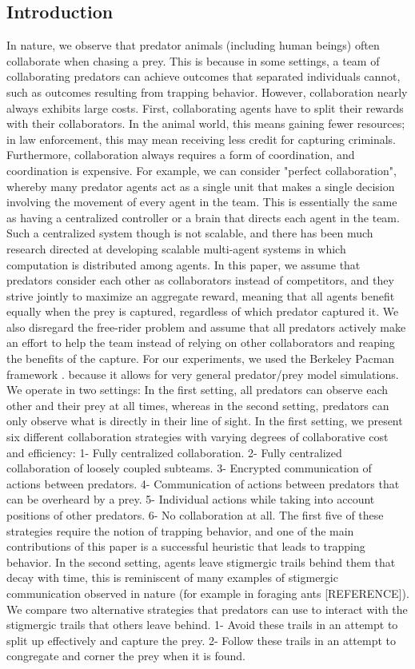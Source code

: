 \documentclass[11pt]{article}
\begin{document}
\begin{multicols}{2}
\section{Introduction}
In nature, we observe that predator animals (including human beings) often collaborate when chasing a prey. This is because in some settings, a team of collaborating predators can achieve outcomes that separated individuals cannot, such as outcomes resulting from trapping behavior. However, collaboration nearly always exhibits large costs. First, collaborating agents have to split their rewards with their collaborators. In the animal world, this means gaining fewer resources; in law enforcement, this may mean receiving less credit for capturing criminals. Furthermore, collaboration always requires a form of coordination, and coordination is expensive. For example, we can consider "perfect collaboration", whereby many predator agents act as a single unit that makes a single decision involving the movement of every agent in the team. This is essentially the same as having a centralized controller or a brain that directs each agent in the team. Such a centralized system though is not scalable, and there has been much research directed at developing scalable multi-agent systems in which computation is distributed among agents. In this paper, we assume that predators consider each other as collaborators instead of competitors, and they strive jointly to maximize an aggregate reward, meaning that all agents benefit equally when the prey is captured, regardless of which predator captured it. We also disregard the free-rider problem and assume that all predators actively make an effort to help the team instead of relying on other collaborators and reaping the benefits of the capture. For our experiments, we used the Berkeley Pacman framework \cite{Pacman}. because it allows for very general predator/prey model simulations. We operate in two settings: In the first setting, all predators can observe each other and their prey at all times, whereas in the second setting, predators can only observe what is directly in their line of sight. In the first setting, we present six different collaboration strategies with varying degrees of collaborative cost and efficiency: 1- Fully centralized collaboration. 2- Fully centralized collaboration of loosely coupled subteams. 3- Encrypted communication of actions between predators. 4- Communication of actions between predators that can be overheard by a prey. 5- Individual actions while taking into account positions of other predators. 6- No collaboration at all. The first five of these strategies require the notion of trapping behavior, and one of the main contributions of this paper is a successful heuristic that leads to trapping behavior. In the second setting, agents leave stigmergic trails behind them that decay with time, this is reminiscent of many examples of stigmergic communication observed in nature (for example in foraging ants [REFERENCE]). We compare two alternative strategies that predators can use to interact with the stigmergic trails that others leave behind. 1- Avoid these trails in an attempt to split up effectively and capture the prey. 2- Follow these trails in an attempt to congregate and corner the prey when it is found.\\

\end{multicols}
\end{document}
